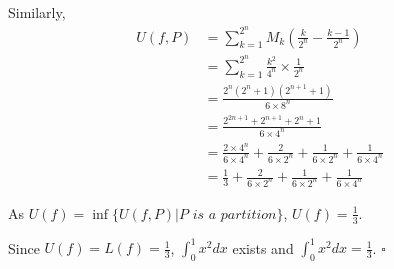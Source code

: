 \documentclass{article}
\begin{document}
\begin{enumerate}
    Similarly, 
    \begin{align*}
        U(f, P) &= \sum\limits_{k=1}^{2^n} M_k(\frac{k}{2^n} - \frac{k-1}{2^n})\\
        & = \sum\limits_{k=1}^{2^n} \frac{k^2}{4^n} \times \frac{1}{2^n}\\
        & = \frac{2^n(2^n+1)(2^{n+1}+1)}{6\times8^n}\\
        & = \frac{2^{2n+1} +2^{n+1} + 2^n +1}{6\times4^n}\\
        & = \frac{2\times4^n}{6\times4^n} + \frac{2}{6\times2^n} + \frac{1}{6\times2^n} + \frac{1}{6\times 4^n}\\
        & = \frac{1}{3} + \frac{2}{6\times2^n} + \frac{1}{6\times2^n} + \frac{1}{6\times 4^n}
    \end{align*}

    As $U(f) = \inf \{ U(f, P) | P \textit{ is a partition}\}$, $U(f) = \frac{1}{3}$.

    Since $U(f) = L(f) = \frac{1}{3}$, $\int_{0}^1 x^2 \textit{dx}$ exists and $\int_{0}^1 x^2 \textit{dx} = \frac{1}{3}$. $\square$
\end{enumerate}
\end{document}
